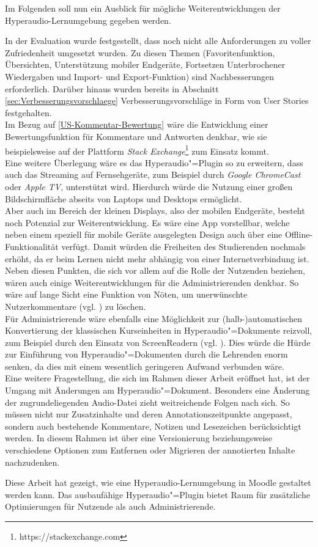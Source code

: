 Im Folgenden soll nun ein Ausblick für mögliche Weiterentwicklungen der Hyperaudio-Lernumgebung gegeben werden.

In der Evaluation wurde festgestellt, dass noch nicht alle Anforderungen zu voller Zufriedenheit umgesetzt wurden. Zu diesen Themen (Favoritenfunktion, Übersichten, Unterstützung mobiler Endgeräte, Fortsetzen Unterbrochener Wiedergaben und Import- und Export-Funktion) sind Nachbesserungen erforderlich. Darüber hinaus wurden bereits in Abschnitt \ref{sec:Verbesserungsvorschlaege} Verbesserungsvorschläge in Form von User Stories festgehalten.\\
Im Bezug auf \ref{US-Kommentar-Bewertung} wäre die Entwicklung einer Bewertungsfunktion für Kommentare und Antworten denkbar, wie sie beispielsweise auf der Plattform \textit{Stack Exchange}\footnote{https://stackexchange.com} zum Einsatz kommt.\\
Eine weitere Überlegung wäre es das Hyperaudio"=Plugin so zu erweitern, dass auch das Streaming auf Fernsehgeräte, zum Beispiel durch \textit{Google ChromeCast} oder \textit{Apple TV}, unterstützt wird. Hierdurch würde die Nutzung einer großen Bildschirmfläche abseits von Laptops und Desktops ermöglicht.\\
Aber auch im Bereich der kleinen Displays, also der mobilen Endgeräte, besteht noch Potenzial zur Weiterentwicklung. Es wäre eine App vorstellbar, welche neben einem speziell für mobile Geräte ausgelegten Design auch über eine Offline-Funktionalität verfügt. Damit würden die Freiheiten des Studierenden nochmals erhöht, da er beim Lernen nicht mehr abhängig von einer Internetverbindung ist.\\
Neben diesen Punkten, die sich vor allem auf die Rolle der Nutzenden beziehen, wären auch einige Weiterentwicklungen für die Administrierenden denkbar. So wäre auf lange Sicht eine Funktion von Nöten, um unerwünschte Nutzerkommentare (vgl. \cite{reinmann2002analyse}) zu löschen.\\
Für Administrierende wäre ebenfalls eine Möglichkeit zur (halb-)automatischen Konvertierung der klassischen Kurseinheiten in Hyperaudio"=Dokumente reizvoll, zum Beispiel durch den Einsatz von ScreenReadern (vgl. \cite{donker2007gestaltung}). Dies würde die Hürde zur Einführung von Hyperaudio"=Dokumenten durch die Lehrenden enorm senken, da dies mit einem wesentlich geringeren Aufwand verbunden wäre.\\
Eine weitere Fragestellung, die sich im Rahmen dieser Arbeit eröffnet hat, ist der Umgang mit Änderungen am Hyperaudio"=Dokument. Besonders eine Änderung der zugrundeliegenden Audio-Datei zieht weitreichende Folgen nach sich. So müssen nicht nur Zusatzinhalte und deren Annotationszeitpunkte angepasst, sondern auch bestehende Kommentare, Notizen und Lesezeichen berücksichtigt werden. In diesem Rahmen ist über eine Versionierung beziehungsweise verschiedene Optionen zum Entfernen oder Migrieren der annotierten Inhalte nachzudenken.

Diese Arbeit hat gezeigt, wie eine Hyperaudio-Lernumgebung in Moodle gestaltet werden kann. Das ausbaufähige Hyperaudio"=Plugin bietet Raum für zusätzliche Optimierungen für Nutzende als auch Administrierende.